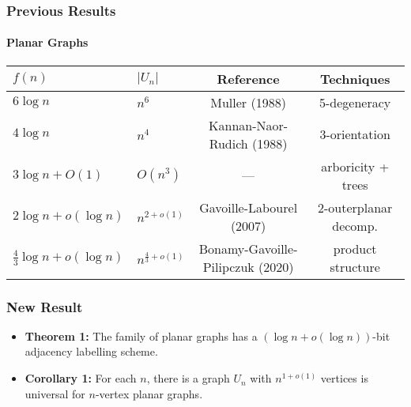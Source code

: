 \documentclass[aspectratio=169,xcolor=dvipsnames]{beamer}
\begin{document}
\begin{frame}
    \frametitle{Previous Results}
    \framesubtitle{Planar Graphs}
    \begin{center}
        \begin{tabular}{llcc}
            $f(n)$ & $|U_n|$ & Reference & Techniques \\ \hline
            $6\log n$ & $n^6$ & Muller (1988) & 5-degeneracy \\
            $4\log n$ & $n^4$ & Kannan-Naor-Rudich (1988) & 3-orientation \\
            $3\log n + O(1)$ & $O(n^3)$ & --- & arboricity + trees \\
            $2\log n + o(\log n)$ & $n^{2+o(1)}$ & Gavoille-Labourel (2007) & 2-outerplanar decomp. \\
            $\tfrac{4}{3}\log n + o(\log n)$ & $n^{\tfrac{4}{3}+o(1)}$ & Bonamy-Gavoille-Pilipczuk (2020) & product structure  \\
        \end{tabular}
    \end{center}
\end{frame}

\begin{frame}
    \frametitle{New Result}

    \begin{itemize}
        \item<+-> \textbf{Theorem 1:} The family of planar graphs has a $(\log n + o(\log n))$-bit adjacency labelling scheme.


        \item<+-> \textbf{Corollary 1:} For each $n$, there is a graph $U_n$ with $n^{1+o(1)}$ vertices is universal for $n$-vertex planar graphs.

    \end{itemize}
\end{frame}
\end{document}
